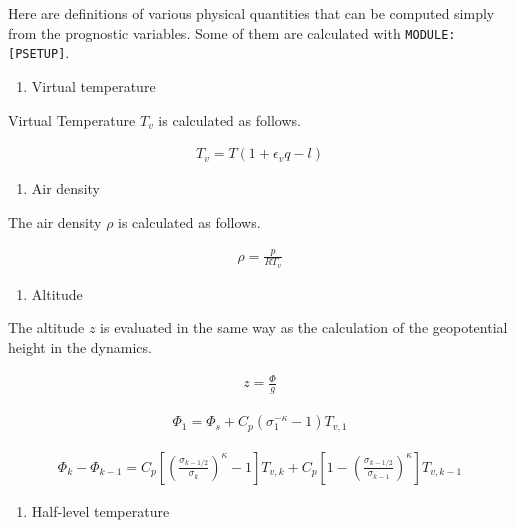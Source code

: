 Here are definitions of various physical quantities that can be computed simply from the prognostic variables. Some of them are calculated with \texttt{MODULE:{[}PSETUP{]}}.

\begin{enumerate}
\def\labelenumi{\arabic{enumi}.}
\tightlist
\item
  Virtual temperature
\end{enumerate}

Virtual Temperature \(T_v\) is calculated as follows.

\begin{eqnarray}
  T_v = T ( 1 + \epsilon_v q - l )
\end{eqnarray}

\begin{enumerate}
\def\labelenumi{\arabic{enumi}.}
\setcounter{enumi}{1}
\tightlist
\item
  Air density
\end{enumerate}

The air density \(\rho\) is calculated as follows.

\begin{eqnarray}
  \rho = \frac{p}{RT_v}
\end{eqnarray}

\begin{enumerate}
\def\labelenumi{\arabic{enumi}.}
\setcounter{enumi}{2}
\tightlist
\item
  Altitude
\end{enumerate}

The altitude \(z\) is evaluated in the same way as the calculation of the geopotential height in the dynamics.

\begin{eqnarray}
  z = \frac{\Phi}{g}
\end{eqnarray}

\begin{eqnarray}
 \Phi_{1}  =  \Phi_{s} + C_{p} ( \sigma_{1}^{-\kappa} - 1  ) T_{v,1}
\end{eqnarray}

\begin{eqnarray}
 \Phi_k - \Phi_{k-1}
   =  C_{p}
   \left[ \left( \frac{ \sigma_{k-1/2} }{ \sigma_k } \right)^{\kappa}
          - 1 \right] T_{v,k}
       + C_{p}
   \left[ 1-
         \left( \frac{ \sigma_{k-1/2} }{ \sigma_{k-1} } \right)^{\kappa}
              \right] T_{v,k-1}
\end{eqnarray}

\begin{enumerate}
\def\labelenumi{\arabic{enumi}.}
\setcounter{enumi}{3}
\tightlist
\item
  Half-level temperature
\end{enumerate}

